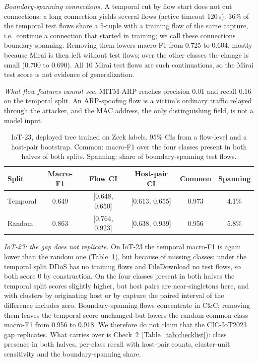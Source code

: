 \emph{Boundary-spanning connections.} A temporal cut by flow start does not cut connections: a long connection yields several flows (active timeout 120\,s). 36\% of the temporal test flows share a 5-tuple with a training flow of the same capture, i.e.\ continue a connection that started in training; we call these connections boundary-spanning. Removing them lowers macro-F1 from 0.725 to 0.604, mostly because Mirai is then left without test flows; over the other classes the change is small (0.700 to 0.690). All 10 Mirai test flows are such continuations, so the Mirai test score is not evidence of generalization.

\emph{What flow features cannot see.} MITM-ARP reaches precision 0.01 and recall 0.16 on the temporal split. An ARP-spoofing flow is a victim's ordinary traffic relayed through the attacker, and the MAC address, the only distinguishing field, is not a model input.

\begin{table}[t]
\centering
\caption{IoT-23, deployed tree trained on Zeek labels. 95\% CIs from a flow-level and a host-pair bootstrap. Common: macro-F1 over the four classes present in both halves of both splits. Spanning: share of boundary-spanning test flows.}
\label{tab:iot23split}
\footnotesize
\setlength{\tabcolsep}{2.5pt}
\begin{tabular}{lccccc}
\toprule
Split & Macro-F1 & Flow CI & Host-pair CI & Common & Spanning \\
\midrule
Temporal & 0.649 & [0.648, 0.650] & [0.613, 0.655] & 0.973 & 4.1\% \\
Random   & 0.863 & [0.764, 0.923] & [0.638, 0.939] & 0.956 & 5.8\% \\
\bottomrule
\end{tabular}
\end{table}

\emph{IoT-23: the gap does not replicate.} On IoT-23 the temporal macro-F1 is again lower than the random one (Table~\ref{tab:iot23split}), but because of missing classes: under the temporal split DDoS has no training flows and FileDownload no test flows, so both score 0 by construction. On the four classes present in both halves the temporal split scores slightly higher, but host pairs are near-singletons here, and with clusters by originating host or by capture the paired interval of the difference includes zero. Boundary-spanning flows concentrate in C\&C; removing them leaves the temporal score unchanged but lowers the random common-class macro-F1 from 0.956 to 0.918. We therefore do not claim that the CIC-IoT2023 gap replicates. What carries over is Check~2 (Table~\ref{tab:checklist}): class presence in both halves, per-class recall with host-pair counts, cluster-unit sensitivity and the boundary-spanning share.
